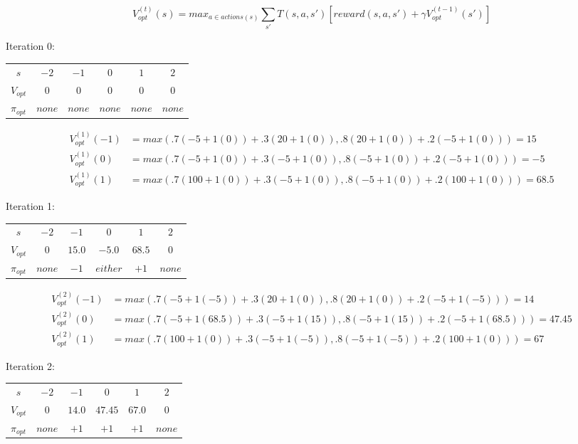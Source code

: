 \documentclass[10pt]{article}
\begin{document}
\begin{enumerate}[label=(\alph*)]
	$$V_{opt}^{(t)}(s) = max_{a \in actions(s)} \sum_{s'} T(s,a,s')[reward(s,a,s') + \gamma V_{opt}^{(t-1)}(s')]$$	
	
	Iteration 0:\\
	\begin{tabular}{c | c c c c c}
		$s$ & $-2$ & $-1$ & $0$ & $1$ & $2$ \\
  		$V_{opt}$ & $0$ & $0$ & $0$ & $0$ & $0$ \\
  		$\pi_{opt}$ & $none$ & $none$ & $none$ & $none$ & $none$ \\
	\end{tabular}
  
  \begin{align*}
  		V_{opt}^{(1)}(-1) &= max(.7(-5 + 1(0)) + .3(20 + 1(0)), .8(20 + 1(0)) + .2(-5 + 1(0))) = 15\\
  		V_{opt}^{(1)}(0) &= max(.7(-5 + 1(0)) + .3(-5 + 1(0)), .8(-5 + 1(0)) + .2(-5 + 1(0))) = -5\\
  		V_{opt}^{(1)}(1) &= max(.7(100 + 1(0)) + .3(-5 + 1(0)), .8(-5 + 1(0)) + .2(100 + 1(0))) = 68.5
	\end{align*}
	
	Iteration 1:\\
	\begin{tabular}{c | c c c c c}
		$s$ & $-2$ & $-1$ & $0$ & $1$ & $2$ \\
  		$V_{opt}$ & $0$ & $15.0$ & $-5.0$ & $68.5$ & $0$ \\
  		$\pi_{opt}$ & $none$ & $-1$ & $either$ & $+1$ & $none$ \\
	\end{tabular}
	
	\begin{align*}
  		V_{opt}^{(2)}(-1) &= max(.7(-5 + 1(-5)) + .3(20 + 1(0)), .8(20 + 1(0)) + .2(-5 + 1(-5))) = 14\\
  		V_{opt}^{(2)}(0) &= max(.7(-5 + 1(68.5)) + .3(-5 + 1(15)), .8(-5 + 1(15)) + .2(-5 + 1(68.5))) = 47.45\\
  		V_{opt}^{(2)}(1) &= max(.7(100 + 1(0)) + .3(-5 + 1(-5)), .8(-5 + 1(-5)) + .2(100 + 1(0))) = 67
	\end{align*}
	
	Iteration 2:\\
	\begin{tabular}{c | c c c c c}
		$s$ & $-2$ & $-1$ & $0$ & $1$ & $2$ \\
  		$V_{opt}$ & $0$ & $14.0$ & $47.45$ & $67.0$ & $0$ \\
  		$\pi_{opt}$ & $none$ & $+1$ & $+1$ & $+1$ & $none$ \\
  	\end{tabular}

\end{enumerate}
\iffalse
\end{document}
